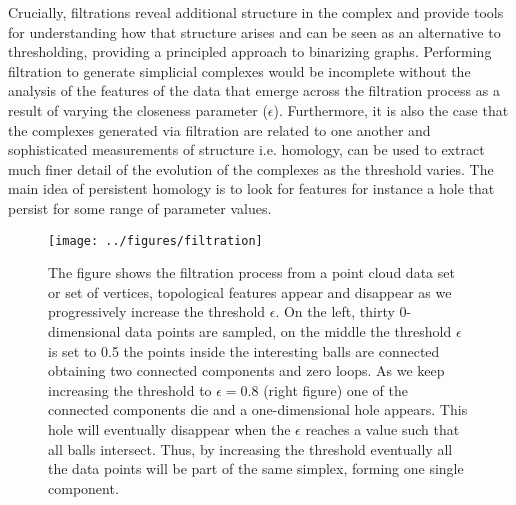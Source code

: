 \documentclass[onecollarge,runningheads]{svjour2}
\begin{document}
Crucially, filtrations reveal additional structure in the complex and provide tools for understanding how that structure arises and can be seen as an alternative to thresholding, providing a principled approach to binarizing graphs. Performing filtration to generate simplicial complexes would be incomplete without the analysis of the features of the data that emerge across the filtration process as a result of varying the closeness parameter ($\epsilon$). Furthermore, it is also the case that the complexes generated via filtration are related to one another and sophisticated measurements of structure i.e. homology, can be used to extract much finer detail of the evolution of the complexes as the threshold varies.
The main idea of persistent homology is to look for features for instance a hole that persist for some range of parameter values.


\begin{figure}[h]
        \centering
        \texttt{[image: ../figures/filtration]}
        \caption{The figure shows the filtration process from a point cloud data set or set of vertices, topological features appear and disappear as we progressively increase the threshold $\epsilon$. On the left, thirty 0-dimensional data points are sampled, on the middle the threshold $\epsilon$ is set to 0.5 the points inside the interesting balls are connected obtaining two connected components and zero loops. As we keep increasing the threshold to $\epsilon = 0.8$ (right figure) one of the connected components die and a one-dimensional hole appears. This hole will eventually disappear when the $\epsilon$ reaches a value such that all balls intersect. Thus, by increasing the threshold eventually all the data points will be part of the same simplex, forming one single component.}
\label{fig:whyweneedfiltration}
\end{figure}
\end{document}
